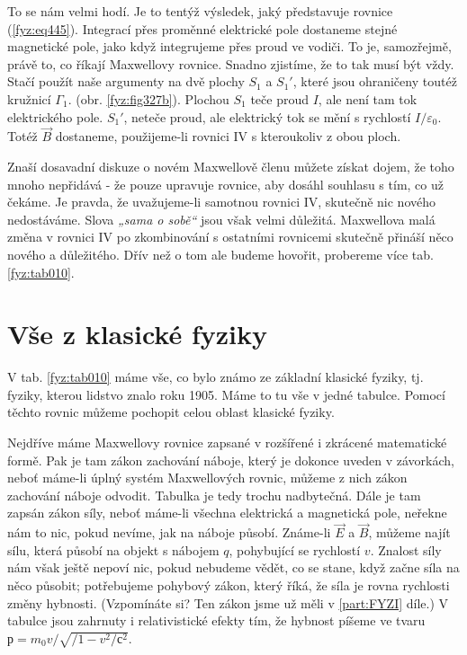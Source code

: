   To se nám velmi hodí. Je to tentýž výsledek, jaký představuje rovnice (\ref{fyz:eq445}). 
  Integrací přes proměnné elektrické pole dostaneme stejné magnetické pole, jako když integrujeme 
  přes proud ve vodiči. To je, samozřejmě, právě to, co říkají Maxwellovy rovnice. Snadno zjistíme, 
  že to tak musí být vždy. Stačí použít naše argumenty na dvě plochy \(S_1\) a \(S_1'\), které jsou 
  ohraničeny toutéž kružnicí \(\Gamma_1\). (obr. \ref{fyz:fig327b}). Plochou \(S_1\) teče proud 
  \(I\), ale není tam tok elektrického pole. \(S_1'\), neteče proud, ale elektrický tok se mění s 
  rychlostí \(I/\varepsilon_0\). Totéž \(\vec{B}\) dostaneme, použijeme-li rovnici IV s kteroukoliv 
  z obou ploch. 
  
  Znaší dosavadní diskuze o novém Maxwellově členu můžete získat dojem, že toho mnoho nepřidává - 
  že pouze upravuje rovnice, aby dosáhl souhlasu s tím, co už čekáme. Je pravda, že uvažujeme-li 
  samotnou rovnici IV, skutečně nic nového nedostáváme. Slova \emph{„sama o sobě“} jsou však velmi 
  důležitá. Maxwellova malá změna v rovnici IV po zkombinování s ostatními rovnicemi skutečně 
  přináší něco nového a důležitého. Dřív než o tom ale budeme hovořit, probereme více tab. 
  \ref{fyz:tab010}.
  
\section{Vše z klasické fyziky}\label{fyz:IIchapXVIIIsecII}
  V tab. \ref{fyz:tab010} máme vše, co bylo známo ze základní klasické fyziky, tj. fyziky, kterou 
  lidstvo znalo roku 1905. Máme to tu vše v jedné tabulce. Pomocí těchto rovnic můžeme pochopit 
  celou oblast klasické fyziky.
  
  Nejdříve máme Maxwellovy rovnice zapsané v rozšířené i zkrácené matematické formě. Pak je tam 
  zákon zachování náboje, který je dokonce uveden v závorkách, neboť máme-li úplný systém 
  Maxwellových rovnic, můžeme z nich zákon zachování náboje odvodit. Tabulka je tedy trochu 
  nadbytečná. Dále je tam zapsán zákon síly, neboť máme-li všechna elektrická a magnetická pole, 
  neřekne nám to nic, pokud nevíme, jak na náboje působí. Známe-li \(\vec{E}\) a \(\vec{B}\), 
  můžeme najít sílu, která působí na objekt s nábojem \(q\), pohybující se rychlostí \(v\). Znalost 
  síly nám však ještě nepoví nic, pokud nebudeme vědět, co se stane, když začne síla na něco 
  působit; potřebujeme pohybový zákon, který říká, že síla je rovna rychlosti změny hybnosti. 
  (Vzpomínáte si? Ten zákon jsme už měli v \ref{part:FYZI} díle.) V tabulce jsou zahrnuty i 
  relativistické efekty tím, že hybnost píšeme ve tvaru \(р = m_0v/\sqrt{/1 - v^2/с^2}\).
  
